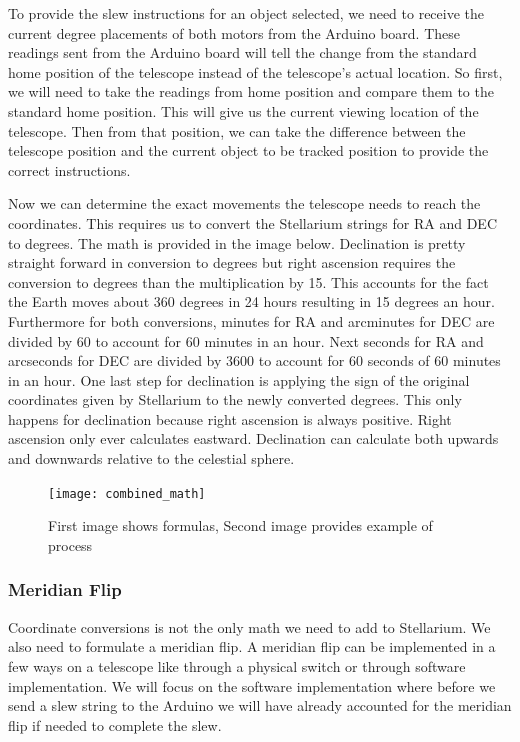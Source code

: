 \documentclass[12pt]{article}
\begin{document}
To provide the slew instructions for an object selected, we need to receive the current degree placements of both motors from the Arduino board. These readings sent from the Arduino board will tell the change from the standard home position of the telescope instead of the telescope’s actual location. So first, we will need to take the readings from home position and compare them to the standard home position. This will give us the current viewing location of the telescope. Then from that position, we can take the difference between the telescope position and the current object to be tracked position to provide the correct instructions.

Now we can determine the exact movements the telescope needs to reach the coordinates. This requires us to convert the Stellarium strings for RA and DEC to degrees. The math is provided in the image below. Declination is pretty straight forward in conversion to degrees but right ascension requires the conversion to degrees than the multiplication by 15. This accounts for the fact the Earth moves about 360 degrees in 24 hours resulting in 15 degrees an hour. Furthermore for both conversions, minutes for RA and arcminutes for DEC are divided by 60 to account for 60 minutes in an hour. Next seconds  for RA and arcseconds for DEC are divided by 3600 to account for 60 seconds of 60 minutes in an hour. One last step for declination is applying the sign of the original coordinates given by Stellarium to the newly converted degrees. This only happens for declination because right ascension is always positive. Right ascension only ever calculates eastward. Declination can calculate both upwards and downwards relative to the celestial sphere.

\begin{figure}[h]
  \centering
  \texttt{[image: combined\_math]}
  \caption{First image shows formulas, Second image provides example of process}
  \label{fig:combinedmath}
\end{figure}

\newpage

\subsubsection{Meridian Flip}

Coordinate conversions is not the only math we need to add to Stellarium. We also need to formulate a meridian flip. A meridian flip can be implemented in a few ways on a telescope like through a physical switch or through software implementation. We will focus on the software implementation where before we send a slew string to the Arduino we will have already accounted for the meridian flip if needed to complete the slew.
\end{document}
